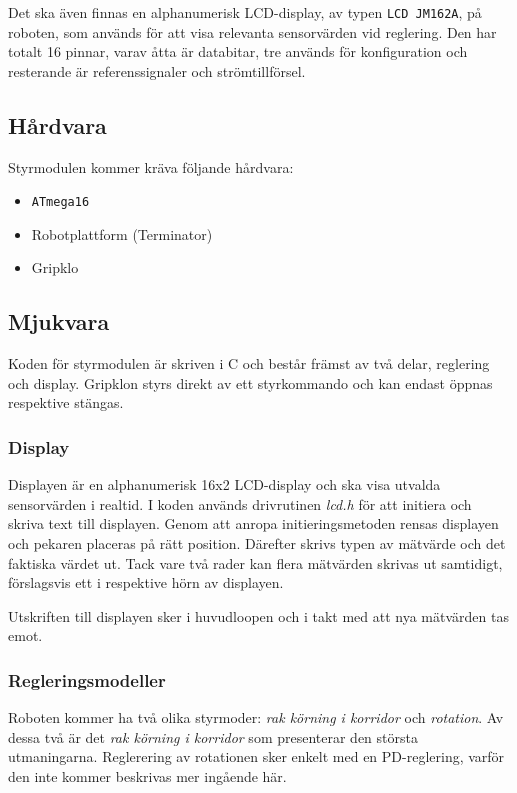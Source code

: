\documentclass[11pt]{article}
\begin{document}
\begin{flushleft}
Det ska även finnas en alphanumerisk LCD-display, av typen \verb+LCD JM162A+, på roboten, som används för att visa relevanta sensorvärden vid reglering. Den har totalt 16 pinnar, varav åtta är databitar, tre används för konfiguration och resterande är referenssignaler och strömtillförsel.

\subsection{Hårdvara}
Styrmodulen kommer kräva följande hårdvara:
\begin{itemize}
	\item \verb+ATmega16+
	\item Robotplattform (Terminator)
	\item Gripklo %
\end{itemize}

\subsection{Mjukvara}
Koden för styrmodulen är skriven i C och består främst av två delar, reglering och display. Gripklon styrs direkt av ett styrkommando och kan endast öppnas respektive stängas.


\subsubsection{Display}
Displayen är en alphanumerisk 16x2 LCD-display och ska visa utvalda sensorvärden i realtid. I koden används drivrutinen \emph{lcd.h} för att initiera och skriva text till displayen. Genom att anropa initieringsmetoden rensas displayen och pekaren placeras på rätt position. Därefter skrivs typen av mätvärde och det faktiska värdet ut. Tack vare två rader kan flera mätvärden skrivas ut samtidigt, förslagsvis ett i respektive hörn av displayen.

Utskriften till displayen sker i huvudloopen och i takt med att nya mätvärden tas emot.

\subsubsection{Regleringsmodeller} \label{mjukvarureglering}
Roboten kommer ha två olika styrmoder: \textit{rak körning i korridor} och \textit{rotation}. Av dessa två är det \textit{rak körning i korridor} som presenterar den största utmaningarna. Reglerering av rotationen sker enkelt med en PD-reglering, varför den inte kommer beskrivas mer ingående här. 


\end{flushleft}
\end{document}

